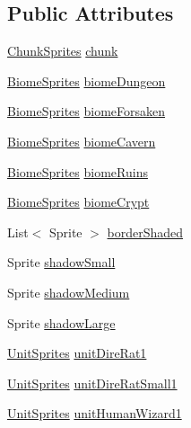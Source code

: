 \subsection*{Public Attributes}
\begin{DoxyCompactItemize}
\item 
\mbox{\hyperlink{class_chunk_sprites}{Chunk\+Sprites}} \mbox{\hyperlink{class_sprite_manager_ae36fc0375ef03f1a92f4dc5ce5e8c28e}{chunk}}
\item 
\mbox{\hyperlink{class_biome_sprites}{Biome\+Sprites}} \mbox{\hyperlink{class_sprite_manager_a5609d24117047d07f812720312e89bcc}{biome\+Dungeon}}
\item 
\mbox{\hyperlink{class_biome_sprites}{Biome\+Sprites}} \mbox{\hyperlink{class_sprite_manager_a18f337bc067753cedff7f6be8cd6ead9}{biome\+Forsaken}}
\item 
\mbox{\hyperlink{class_biome_sprites}{Biome\+Sprites}} \mbox{\hyperlink{class_sprite_manager_a59bc7917142934092c7b3888451dd9e4}{biome\+Cavern}}
\item 
\mbox{\hyperlink{class_biome_sprites}{Biome\+Sprites}} \mbox{\hyperlink{class_sprite_manager_a178699db75afaae518b018060e713d1d}{biome\+Ruins}}
\item 
\mbox{\hyperlink{class_biome_sprites}{Biome\+Sprites}} \mbox{\hyperlink{class_sprite_manager_a5b6ce80cce6056259bef0eaae96437b8}{biome\+Crypt}}
\item 
List$<$ Sprite $>$ \mbox{\hyperlink{class_sprite_manager_a84590ce51ebbabbf1bc9178cf5171bff}{border\+Shaded}}
\item 
Sprite \mbox{\hyperlink{class_sprite_manager_aaa639abfba2f6953eb0f05e2499a0f5b}{shadow\+Small}}
\item 
Sprite \mbox{\hyperlink{class_sprite_manager_ad0c92cb2fd6fb3b89ae92e25afb276d9}{shadow\+Medium}}
\item 
Sprite \mbox{\hyperlink{class_sprite_manager_a9dbc29720d2da6bf1134bc274660de70}{shadow\+Large}}
\item 
\mbox{\hyperlink{class_unit_sprites}{Unit\+Sprites}} \mbox{\hyperlink{class_sprite_manager_aed32ebd20520e91c386d535c8a9af083}{unit\+Dire\+Rat1}}
\item 
\mbox{\hyperlink{class_unit_sprites}{Unit\+Sprites}} \mbox{\hyperlink{class_sprite_manager_ad7e2790eb7fd72146eb0bcb9bb5af38a}{unit\+Dire\+Rat\+Small1}}
\item 
\mbox{\hyperlink{class_unit_sprites}{Unit\+Sprites}} \mbox{\hyperlink{class_sprite_manager_a4f4c6fae4516ee557d4929d477cc1d67}{unit\+Human\+Wizard1}}
\item 

\end{DoxyCompactItemize}
